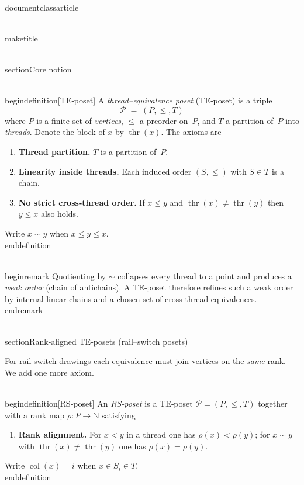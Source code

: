 \\documentclass{article}
\begin{document}
\\maketitle

\\section{Core notion}

\\begin{definition}[TE‑poset]\label{def:TE}
A \emph{thread--equivalence poset} (TE‑poset) is a triple
\[
  \mathcal P \;=\;(P,\le,T)
\]
where $P$ is a finite set of \emph{vertices}, $\le$ a preorder on~$P$,
and $T$ a partition of~$P$ into \emph{threads}.  Denote the block of
$x$ by $\operatorname{thr}(x)$.  The axioms are
\begin{enumerate}[label=\textbf{T\arabic*}, wide]
  \item\label{ax:t1} \textbf{Thread partition.} $T$ is a partition of~$P$.
  \item\label{ax:t2} \textbf{Linearity inside threads.} Each induced
        order $(S,\le)$ with $S\in T$ is a chain.
  \item\label{ax:t3} \textbf{No strict cross‑thread order.}  If
        $x\le y$ and $\operatorname{thr}(x)\neq\operatorname{thr}(y)$ then
        $y\le x$ also holds.
\end{enumerate}
Write $x\sim y$ when $x\le y\le x$.
\\end{definition}

\\begin{remark}
Quotienting by $\sim$ collapses every thread to a point and produces a
\emph{weak order} (chain of antichains).  A TE‑poset therefore refines
such a weak order by internal linear chains and a chosen set of
cross‑thread equivalences.
\\end{remark}

\\section{Rank‑aligned TE‑posets (rail--switch posets)}

For rail‑switch drawings each equivalence must join vertices on the
\emph{same} rank.  We add one more axiom.

\\begin{definition}[RS‑poset]\label{def:RS}
An \emph{RS‑poset} is a TE‑poset $\mathcal P=(P,\le,T)$ together with a
rank map $\rho:P\to\mathbb N$ satisfying
\begin{enumerate}[label=\textbf{T4}, wide]
  \item\label{ax:t4} \textbf{Rank alignment.}  For $x<y$ in a thread
    one has $\rho(x)<\rho(y)$; for $x\sim y$ with
    $\operatorname{thr}(x)\neq\operatorname{thr}(y)$ one has
    $\rho(x)=\rho(y)$.
\end{enumerate}
Write $\operatorname{col}(x)=i$ when $x\in S_i\in T$.
\\end{definition}
\end{document}
